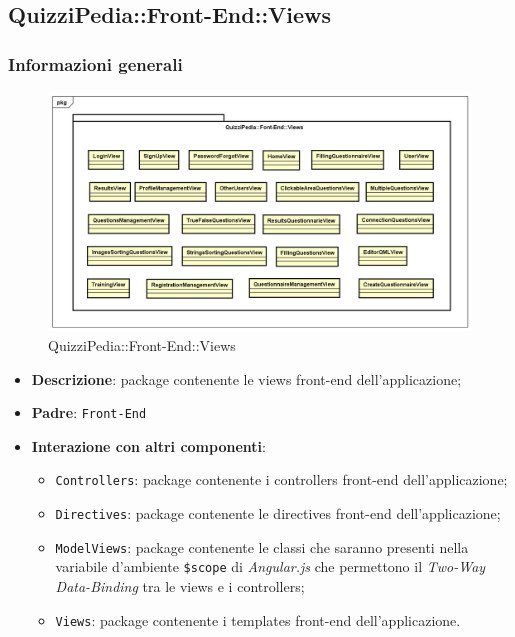 \newpage

\subsection{QuizziPedia::Front-End::Views}
\subsubsection{Informazioni generali}
\label{QuizziPedia::Front-End::Views}
\begin{figure}
	\centering
	\includegraphics[scale=0.45]{UML/Package/QuizziPedia_Front-End_Views.png}
	\caption{QuizziPedia::Front-End::Views}
\end{figure}
\begin{itemize}
	\item \textbf{Descrizione}: package contenente le views front-end dell'applicazione;
	\item \textbf{Padre}: \texttt{Front-End}
	\item \textbf{Interazione con altri componenti}:
	\begin{itemize}
		\item \texttt{Controllers}: package contenente i controllers front-end dell'applicazione;
		\item \texttt{Directives}: package contenente le directives front-end dell'applicazione;
		\item \texttt{ModelViews}: package contenente le classi che saranno presenti nella variabile d'ambiente \texttt{\$scope} di \textit{Angular.js} che permettono il \textit{Two-Way Data-Binding} tra le views e i controllers;
		\item \texttt{Views}: package contenente i templates front-end dell'applicazione.
	\end{itemize}
\end{itemize}
